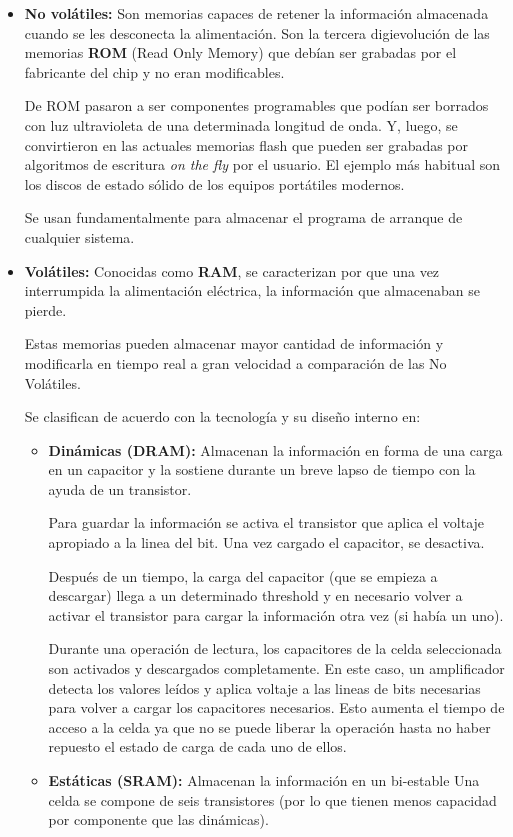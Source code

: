 \begin{itemize}
	\item \textbf{No volátiles:} Son memorias capaces de retener la información almacenada cuando se les desconecta la alimentación. Son la tercera digievolución de las memorias \textbf{ROM} (Read Only Memory) que debían ser grabadas por el fabricante del chip y no eran modificables.
	
	De ROM pasaron a ser componentes programables que podían ser borrados con luz ultravioleta de una determinada longitud de onda. Y, luego, se convirtieron en las actuales memorias flash que pueden ser grabadas por algoritmos de escritura \textit{on the fly} por el usuario. El ejemplo más habitual son los discos de estado sólido de los equipos portátiles modernos.
	
	Se usan fundamentalmente para almacenar el programa de arranque de cualquier sistema.
	
	\item\textbf{Volátiles:} Conocidas como \textbf{RAM}, se caracterizan por que una vez interrumpida la alimentación eléctrica, la información que almacenaban se pierde.
	
	Estas memorias pueden almacenar mayor cantidad de información y modificarla en tiempo real a gran velocidad a comparación de las No Volátiles.
	
	Se clasifican de acuerdo con la tecnología y su diseño interno en:
	
	\begin{itemize}
		\item \textbf{Dinámicas (DRAM):} Almacenan la información en forma de una carga en un capacitor y la sostiene durante un breve lapso de tiempo con la ayuda de un transistor.
		
		Para guardar la información se activa el transistor que aplica el voltaje apropiado a la linea del bit. Una vez cargado el capacitor, se desactiva. 
		
		Después de un tiempo, la carga del capacitor (que se empieza a descargar) llega a un determinado threshold y en necesario volver a activar el transistor para cargar la información otra vez (si había un uno).
		
		Durante una operación de lectura, los capacitores de la celda seleccionada son activados y descargados completamente. En este caso, un amplificador detecta los valores leídos y aplica voltaje a las lineas de bits necesarias para volver a cargar
 		los capacitores necesarios. Esto aumenta el tiempo de acceso a la celda ya que no se puede liberar la operación hasta no haber repuesto el estado de carga de cada uno de ellos.
 		\item \textbf{Estáticas (SRAM):} Almacenan la información en un bi-estable Una celda se compone de seis transistores (por lo que tienen menos capacidad por componente que las dinámicas).
 		

\end{itemize}
\end{itemize}
